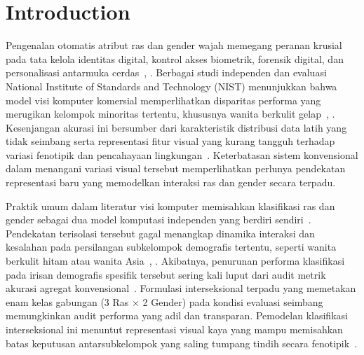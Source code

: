 \section{Introduction}
\label{sec:introduction}

Pengenalan otomatis atribut ras dan gender wajah memegang peranan krusial pada tata kelola identitas digital, kontrol akses biometrik, forensik digital, dan personalisasi antarmuka cerdas~\cite{ref1}, \cite{ref2}. Berbagai studi independen dan evaluasi National Institute of Standards and Technology (NIST) menunjukkan bahwa model visi komputer komersial memperlihatkan disparitas performa yang merugikan kelompok minoritas tertentu, khususnya wanita berkulit gelap~\cite{ref3}, \cite{ref4}. Kesenjangan akurasi ini bersumber dari karakteristik distribusi data latih yang tidak seimbang serta representasi fitur visual yang kurang tangguh terhadap variasi fenotipik dan pencahayaan lingkungan~\cite{ref5}. Keterbatasan sistem konvensional dalam menangani variasi visual tersebut memperlihatkan perlunya pendekatan representasi baru yang memodelkan interaksi ras dan gender secara terpadu.

Praktik umum dalam literatur visi komputer memisahkan klasifikasi ras dan gender sebagai dua model komputasi independen yang berdiri sendiri~\cite{ref6}. Pendekatan terisolasi tersebut gagal menangkap dinamika interaksi dan kesalahan pada persilangan subkelompok demografis tertentu, seperti wanita berkulit hitam atau wanita Asia~\cite{ref7}, \cite{ref8}. Akibatnya, penurunan performa klasifikasi pada irisan demografis spesifik tersebut sering kali luput dari audit metrik akurasi agregat konvensional~\cite{ref9}. Formulasi interseksional terpadu yang memetakan enam kelas gabungan (3 Ras $\times$ 2 Gender) pada kondisi evaluasi seimbang memungkinkan audit performa yang adil dan transparan. Pemodelan klasifikasi interseksional ini menuntut representasi visual kaya yang mampu memisahkan batas keputusan antarsubkelompok yang saling tumpang tindih secara fenotipik~\cite{ref10}.

